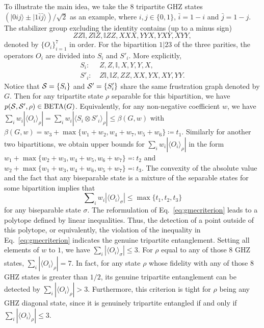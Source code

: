 \documentclass[
12pt,
prx,
aps,
reprint,
a4paper,
longbibliograph,
nofootinbib,
nobibnotes,
superscriptaddress
]{revtex4-2}
\theoremstyle{definition}
\def\id{\mathbb{I}}%
\def\be{\operatorname{BETA}}
\begin{document}
To illustrate the main idea, we take the $8$ tripartite GHZ states $(|0ij\rangle\pm |1\bar{i}\bar{j}\rangle)/\sqrt{2}$ as an example, where $i,j \in \{0,1\}$, $\bar{i}=1-i$ and $\bar{j}=1-j$.
The stabilizer group excluding the identity contains (up to a minus sign)
\begin{equation}\label{eq:stabilizer}
	Z Z\id, Z\id Z, \id Z Z, XXX, YYX, YXY, XYY,
\end{equation}
denoted by $\{O_i\}_{i=1}^7$ in order.
For the bipartition $1|23$ of the three parities, the operators $O_i$ are divided into $S_i$ and $S'_i$. More explicitly,
\begin{align}\label{eq:splitted}
	S_i:\ & Z, Z, \id, X, Y, Y, X,\nonumber\\
	S'_i:\ & Z\id,\id Z,Z Z, XX, YX, XY, YY.
\end{align}
Notice that ${\cal S} =\{S_i\}$ and ${\cal S}' = \{S'_i\}$ share the same frustration graph denoted by $G$.
Then for any tripartite state $\rho$  separable for this bipartition, we have $p({\cal S}, {\cal S}', \rho) \in \be(G)$. Equivalently,
for any non-negative coefficient $w$,  we have
$\sum_i w_i |\langle O_i\rangle_{\rho}|	= \sum_i w_i |\langle S_i\otimes S'_i\rangle_{\rho}| \le \beta(G,w)$ with $\beta(G,w) = w_3+\max\{w_1+w_2,w_4+w_7,w_5+w_6\} \coloneqq t_1$.
Similarly for another two bipartitions, we obtain upper bounds for $\sum_i w_i |\langle O_i\rangle_{\rho}|$ in the form $w_1+\max\{w_2+w_3,w_4+w_5,w_6+w_7\} \eqqcolon t_2$ and $w_2+\max\{w_1+w_3,w_4+w_6,w_5+w_7\}\eqqcolon t_3$.
The convexity of the absolute value and the fact that any biseparable state is a mixture of the separable states for some bipartition implies that
\begin{equation}\label{eq:gmecriterion}
	\sum\nolimits_i w_i |\langle O_i\rangle_{\sigma}| \le \max\{t_1, t_2, t_3\}
\end{equation}
for any biseparable state $\sigma$.  
The reformulation of Eq.~\eqref{eq:gmecriterion} leads to a polytope defined by linear inequalities.
Thus, the detection of a point outside of this polytope, or equivalently, the violation of the inequality in Eq.~\eqref{eq:gmecriterion} indicates the genuine tripartite entanglement.
Setting all elements of $w$ to $1$, we have $\sum_i |\langle O_i\rangle_{\sigma}| \le 3$.
For $\rho$ equal to any of those $8$ GHZ states,  $\sum_i |\langle O_i\rangle_{\rho}| = 7$.
In fact, for any state $\rho$ whose fidelity with any of those $8$ GHZ states is greater than $1/2$, its genuine tripartite entanglement can be detected by $\sum_i |\langle O_i\rangle_{\rho}| > 3$. Furthermore, this criterion is tight for $\rho$ being any GHZ diagonal state, since it is genuinely tripartite entangled if and only if $\sum_i |\langle O_i\rangle_\rho| \le 3$.
\end{document}
